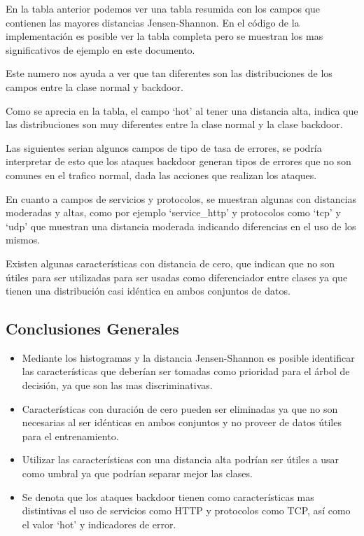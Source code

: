 \documentclass[12pt,a4paper]{article}
\begin{document}
En la tabla anterior podemos ver una tabla resumida con los campos que contienen las mayores distancias Jensen-Shannon.
En el código de la implementación es posible ver la tabla completa pero se muestran los mas significativos de ejemplo en este documento.

Este numero nos ayuda a ver que tan diferentes son las distribuciones de los campos entre la clase normal y backdoor.

Como se aprecia en la tabla, el campo `hot' al tener una distancia alta, indica que las distribuciones son
muy diferentes entre la clase normal y la clase backdoor.

Las siguientes serian algunos campos de tipo de tasa de errores, se podría interpretar de esto que los ataques backdoor
generan tipos de errores que no son comunes en el trafico normal, dada las acciones que realizan los ataques.

En cuanto a campos de servicios y protocolos, se muestran algunas con distancias moderadas y altas, como por ejemplo
`service_http' y protocolos como `tcp' y `udp' que muestran una distancia moderada indicando diferencias en el uso de los mismos.

Existen algunas características con distancia de cero, que indican que no son útiles para ser utilizadas para
ser usadas como diferenciador entre clases ya que tienen una distribución casi idéntica en ambos conjuntos de datos.

\subsection{Conclusiones Generales}\label{subsec:conclusiones-generales}

\begin{itemize}
  \item Mediante los histogramas y la distancia Jensen-Shannon es posible identificar las características que deberían ser tomadas como prioridad para el árbol de decisión, ya que son las mas discriminativas.
  \item Características con duración de cero pueden ser eliminadas ya que no son necesarias al ser idénticas en ambos conjuntos y no proveer de datos útiles para el entrenamiento.
  \item Utilizar las características con una distancia alta podrían ser útiles a usar como umbral ya que podrían separar mejor las clases.
  \item Se denota que los ataques backdoor tienen como características mas distintivas el uso de servicios como HTTP y protocolos como TCP, así como el valor `hot' y indicadores de error.
\end{itemize}
\end{document}
